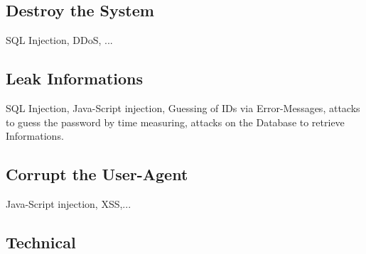 \subsection{Destroy the System}
SQL Injection, DDoS, ...

\subsection{Leak Informations}
SQL Injection, Java-Script injection, Guessing of IDs via Error-Messages, 
attacks to guess the password by time measuring, attacks on the Database to retrieve Informations.

\subsection{Corrupt the User-Agent}
Java-Script injection, XSS,...

\subsection{Technical}



